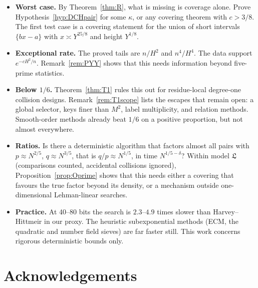 \documentclass[11pt]{amsart}
\theoremstyle{definition}
\begin{document}
\begin{itemize}
\item \textbf{Worst case.} By Theorem~\ref{thm:R}, what is missing is coverage alone. Prove
  Hypothesis~\ref{hyp:DCHpair} for some $\kappa$, or any covering theorem with $c>3/8$. The
  first test case is a covering statement for the union of short intervals
  $\{bx-a\}$ with $x\asymp Y^{25/8}$ and height $Y^{1/8}$.
\item \textbf{Exceptional rate.} The proved tails are $n/H^2$ and $n^4/H^4$. The data support
  $e^{-cH^2/n}$. Remark~\ref{rem:PYY} shows that this needs information beyond five-prime
  statistics.
\item \textbf{Below $1/6$.} Theorem~\ref{thm:T1} rules this out for residue-local degree-one
  collision designs. Remark~\ref{rem:T1scope} lists the escapes that remain open: a global
  selector, keys finer than $M^2$, label multiplicity, and relation methods. Smooth-order
  methods already beat $1/6$ on a positive proportion, but not almost everywhere.
\item \textbf{Ratios.} Is there a deterministic algorithm that factors almost all pairs with
  $p\approx N^{2/5}$, $q\approx N^{3/5}$, that is $q/p\approx N^{1/5}$, in time $N^{1/5-\delta}$?
  Within model $\mathfrak L$ (comparisons counted, accidental collisions ignored),
  Proposition~\ref{prop:Oprime} shows that this needs either a covering that favours the true
  factor beyond its density, or a mechanism outside one-dimensional Lehman-linear searches.
\item \textbf{Practice.} At 40--80 bits the search is $2.3$--$4.9$ times slower than
  Harvey--Hittmeir in our proxy. The heuristic subexponential methods (ECM, the quadratic and
  number field sieves) are far faster still. This work concerns rigorous deterministic bounds
  only.
\end{itemize}

\section*{Acknowledgements}
\end{document}
